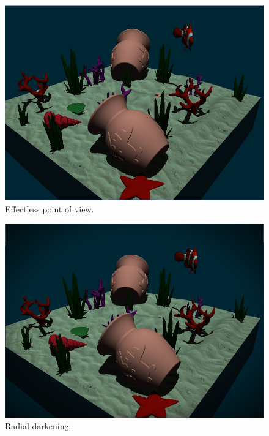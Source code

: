 \documentclass{article}
\begin{document}
\newpage

\begin{figure}[h]
    \centering
    \includegraphics[width=\columnwidth]{imgs/bright_sides.png}
    \caption{Effectless point of view.}
    \label{fig:no_blur}
\end{figure}

\begin{figure}[h]
    \centering
    \includegraphics[width=\columnwidth]{imgs/blur_off.png}
    \caption{Radial darkening.}
    \label{fig:radial_darkening}
\end{figure}
\end{document}
